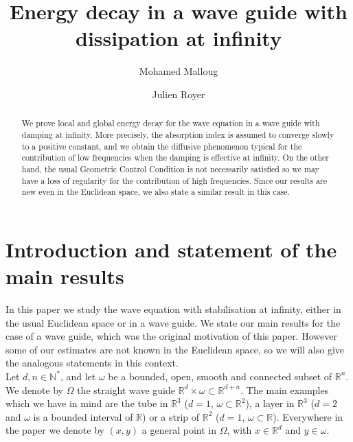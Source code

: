 \documentclass[10pt, a4paper,reqno]{amsart}
\theoremstyle{plain}
\theoremstyle{definition}
\theoremstyle{remark}
\begin{document}
\title{Energy decay in a wave guide with dissipation at infinity}

\author{Mohamed Malloug}
\address[Mohamed Malloug]{\'Ecole Sup\'erieure des Sciences et de la Technologie de Hammam Sousse, Universit\'e de Sousse, Rue Lamine Abassi, 4011 H. Sousse, Tunisia.}

\author{Julien Royer}
\address[Julien Royer]{Institut de Math\'ematiques de Toulouse, Universit\'e Toulouse 3, 118 route de Narbonne, F-31062 Toulouse cedex 9, France.}


\begin{abstract}
We prove local and global energy decay for the wave equation in a wave guide with damping at infinity. More precisely, the absorption index is assumed to converge slowly to a positive constant, and we obtain the diffusive phenomenon typical for the contribution of low frequencies when the damping is effective at infinity. On the other hand, the usual Geometric Control Condition is not necessarily satisfied so we may have a loss of regularity for the contribution of high frequencies. Since our results are new even in the Euclidean space, we also state a similar result in this case.
\end{abstract}

\maketitle

\section{Introduction and statement of the main results}

In this paper we study the wave equation with stabilisation at infinity, either in the usual Euclidean space or in a wave guide. We state our main results for the case of a wave guide, which was the original motivation of this paper. However some of our estimates are not known in the Euclidean space, so we will also give the analogous statements in this context.\\

Let $d,n \in {\mathbb{N}}^*$, and let ${\omega}$ be a bounded, open, smooth and connected subset of ${\mathbb{R}}^n$. We denote by ${\Omega}$ the straight wave guide ${\mathbb{R}}^d \times {\omega} \subset {\mathbb{R}}^{d+n}$. The main examples which we have in mind are the tube in ${\mathbb{R}}^3$ ($d = 1$, ${\omega} \subset {\mathbb{R}}^2$), a layer in ${\mathbb{R}}^3$ ($d = 2$ and ${\omega}$ is a bounded interval of ${\mathbb{R}}$) or a strip of ${\mathbb{R}}^2$ ($d = 1$, ${\omega} \subset {\mathbb{R}}$). Everywhere in the paper we denote by $(x,y)$ a general point in ${\Omega}$, with $x \in {\mathbb{R}}^d$ and $y \in {\omega}$.\\
\end{document}
